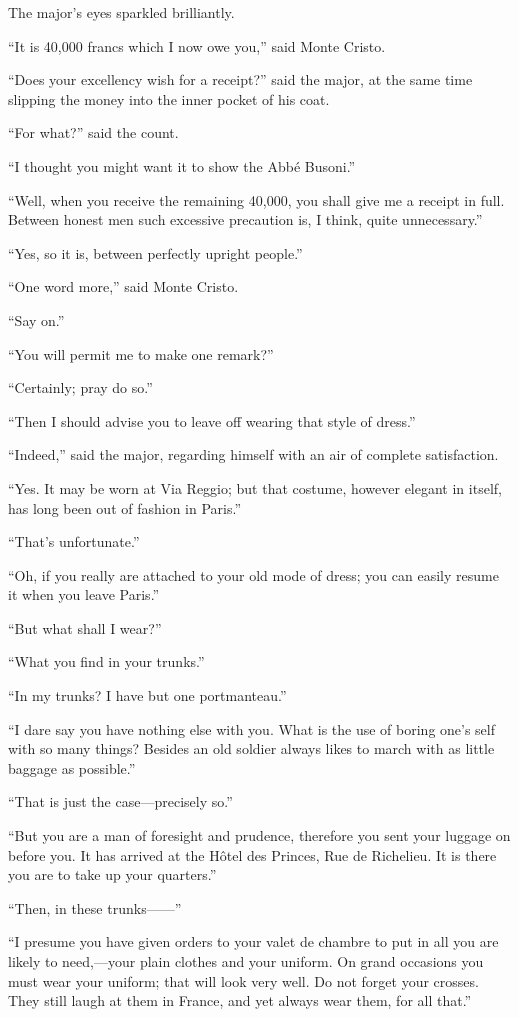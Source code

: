 The major’s eyes sparkled brilliantly.

“It is 40,000 francs which I now owe you,” said Monte Cristo.

“Does your excellency wish for a receipt?” said the major, at the same
time slipping the money into the inner pocket of his coat.

“For what?” said the count.

“I thought you might want it to show the Abbé Busoni.”

“Well, when you receive the remaining 40,000, you shall give me a
receipt in full. Between honest men such excessive precaution is, I
think, quite unnecessary.”

“Yes, so it is, between perfectly upright people.”

“One word more,” said Monte Cristo.

“Say on.”

“You will permit me to make one remark?”

“Certainly; pray do so.”

“Then I should advise you to leave off wearing that style of dress.”

“Indeed,” said the major, regarding himself with an air of complete
satisfaction.

“Yes. It may be worn at Via Reggio; but that costume, however elegant
in itself, has long been out of fashion in Paris.”

“That’s unfortunate.”

“Oh, if you really are attached to your old mode of dress; you can
easily resume it when you leave Paris.”

“But what shall I wear?”

“What you find in your trunks.”

“In my trunks? I have but one portmanteau.”

“I dare say you have nothing else with you. What is the use of boring
one’s self with so many things? Besides an old soldier always likes to
march with as little baggage as possible.”

“That is just the case—precisely so.”

“But you are a man of foresight and prudence, therefore you sent your
luggage on before you. It has arrived at the Hôtel des Princes, Rue de
Richelieu. It is there you are to take up your quarters.”

“Then, in these trunks——”

“I presume you have given orders to your valet de chambre to put in all
you are likely to need,—your plain clothes and your uniform. On grand
occasions you must wear your uniform; that will look very well. Do not
forget your crosses. They still laugh at them in France, and yet always
wear them, for all that.”

